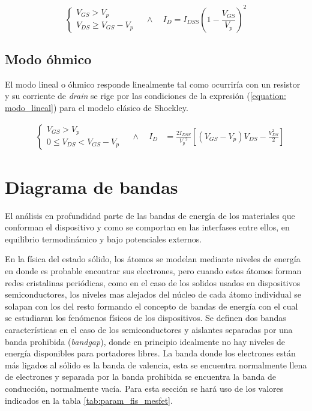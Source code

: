 \documentclass[a4paper]{article}
\begin{document}
\begin{equation}\label{equation:modo_estrangulacion}
		\begin{cases}
			V_{GS} > V_p \\
			V_{DS} \ge V_{GS} - V_p
		\end{cases} \quad \wedge \quad
		I_D = I_{DSS}
		\left(
		1 - \frac{V_{GS}}{V_p}
		\right)^2
\end{equation}



\subsection{Modo óhmico}


El modo lineal o óhmico responde linealmente tal como ocurriría con un resistor y su corriente de \textit{drain} se rige por las condiciones de la expresión (\ref{equation: modo_lineal}) para el modelo clásico de Shockley.
 
\begin{equation}\label{equation: modo_lineal}
	\begin{aligned}
		\quad
		\begin{cases}
			V_{GS} > V_p \\
			0 \le V_{DS} < V_{GS} - V_p
		\end{cases}
		\quad \wedge \quad
		I_D &=
		\frac{2 I_{DSS}}{{V_p}^2}
		\left[
		\left( V_{GS} - V_p \right) V_{DS}
		- \frac{V_{DS}^2}{2}
		\right]
	\end{aligned}
\end{equation}

\section{Diagrama de bandas}



El análisis en profundidad parte de las bandas de energía de los materiales que conforman el dispositivo y como se comportan en las interfases entre ellos, en equilibrio termodinámico y bajo potenciales externos.

En la física del estado sólido, los átomos se modelan mediante niveles de energía en donde es probable encontrar sus electrones, pero cuando estos átomos forman redes cristalinas periódicas, como en el caso de los solidos usados en dispositivos semiconductores, los niveles mas alejados del núcleo de cada átomo individual se solapan con los del resto formando el concepto de bandas de energía con el cual se estudiaran los fenómenos físicos de los dispositivos. Se definen dos bandas características en el caso de los semiconductores y aislantes separadas por una banda prohibida (\textit{bandgap}), donde en principio idealmente no hay niveles de energía disponibles para portadores libres. La banda donde los electrones están más ligados al sólido es la banda de valencia, esta se encuentra normalmente llena de electrones y separada por la banda prohibida se encuentra la banda de conducción, normalmente vacía. Para esta sección se hará uso de los valores indicados en la tabla \ref{tab:param_fis_mesfet}.
\end{document}
